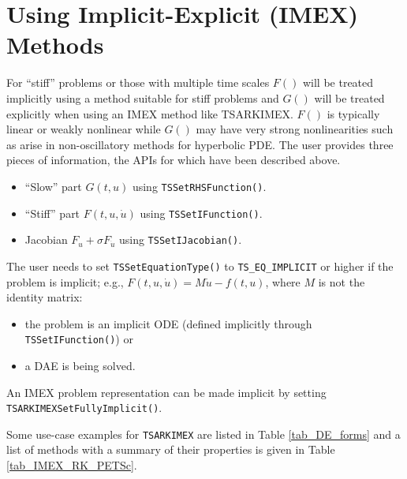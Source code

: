 \section{Using Implicit-Explicit (IMEX) Methods}
\label{sec_imex}
For ``stiff'' problems or those with multiple time scales
$F()$ will be treated implicitly using a method suitable for stiff problems and $G()$ will be treated explicitly when using an IMEX method like TSARKIMEX.
$F()$ is typically linear or weakly nonlinear while $G()$ may have very strong nonlinearities such as arise in non-oscillatory methods for hyperbolic PDE.
The user provides three pieces of information, the APIs for which have been described above.
\begin{itemize}
\item ``Slow'' part $G(t,u)$ using \lstinline{TSSetRHSFunction()}.
\item ``Stiff'' part $F(t,u,\dot u)$ using \lstinline{TSSetIFunction()}.
\item Jacobian $F_u + \sigma F_{\dot u}$ using \lstinline{TSSetIJacobian()}.
\end{itemize}

The user needs to set \lstinline{TSSetEquationType()} to
\lstinline{TS_EQ_IMPLICIT} or higher if the problem is implicit; e.g.,
$F(t,u,\dot u) = M \dot u - f(t,u)$, where $M$ is not the identity matrix:
\begin{itemize}
\item the problem is an implicit ODE (defined implicitly through \lstinline{TSSetIFunction()})
or
\item a DAE is being solved.
\end{itemize}
An IMEX problem representation can be made
implicit by setting \lstinline{TSARKIMEXSetFullyImplicit()}.

Some use-case examples for \lstinline{TSARKIMEX} are listed in Table \ref{tab_DE_forms} and a
list of methods with a summary of their properties is given in
Table \ref{tab_IMEX_RK_PETSc}.

